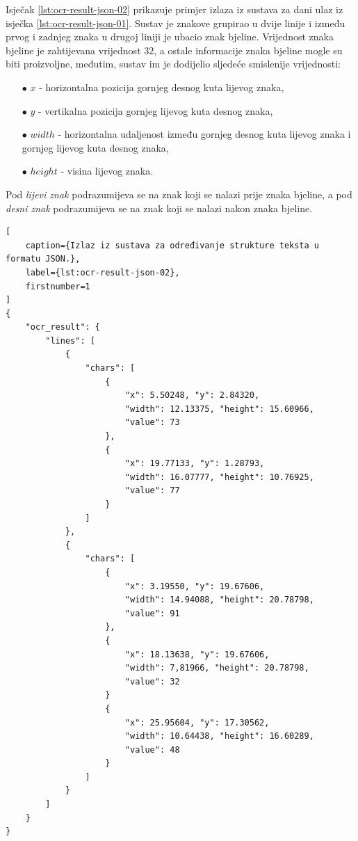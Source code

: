 \documentclass[times, utf8, zavrsni]{fer}
\begin{document}
Isječak \ref{lst:ocr-result-json-02} prikazuje primjer izlaza iz sustava za dani
ulaz iz isječka \ref{lst:ocr-result-json-01}. Sustav je znakove grupirao u dvije
linije i između prvog i zadnjeg znaka u drugoj liniji je ubacio znak bjeline.
Vrijednost znaka bjeline je zahtijevana vrijednost $32$, a ostale informacije
znaka bjeline mogle su biti proizvoljne, međutim, sustav im je dodijelio
sljedeće smislenije vrijednosti:\begin{itemize}
    \item[$\bullet$] $x$ - horizontalna pozicija gornjeg desnog kuta lijevog
                           znaka,
    \item[$\bullet$] $y$ - vertikalna pozicija gornjeg lijevog kuta desnog
                           znaka,
    \item[$\bullet$] $width$ - horizontalna udaljenost između gornjeg desnog
                               kuta lijevog znaka i gornjeg lijevog kuta desnog
                               znaka,
    \item[$\bullet$] $height$ - visina lijevog znaka.
\end{itemize}

Pod \emph{lijevi znak} podrazumijeva se na znak koji se nalazi prije znaka
bjeline, a pod \emph{desni znak} podrazumijeva se na znak koji se nalazi nakon
znaka bjeline.

\pagebreak

\begin{lstlisting}[
    caption={Izlaz iz sustava za određivanje strukture teksta u formatu JSON.},
    label={lst:ocr-result-json-02},
    firstnumber=1
]
{
    "ocr_result": {
        "lines": [
            {
                "chars": [
                    {
                        "x": 5.50248, "y": 2.84320,
                        "width": 12.13375, "height": 15.60966,
                        "value": 73
                    },
                    {
                        "x": 19.77133, "y": 1.28793,
                        "width": 16.07777, "height": 10.76925,
                        "value": 77
                    }
                ]
            },
            {
                "chars": [
                    {
                        "x": 3.19550, "y": 19.67606,
                        "width": 14.94088, "height": 20.78798,
                        "value": 91
                    },
                    {
                        "x": 18.13638, "y": 19.67606,
                        "width": 7,81966, "height": 20.78798,
                        "value": 32
                    }
                    {
                        "x": 25.95604, "y": 17.30562,
                        "width": 10.64438, "height": 16.60289,
                        "value": 48
                    }
                ]
            }
        ]
    }
}
\end{lstlisting}
\end{document}
